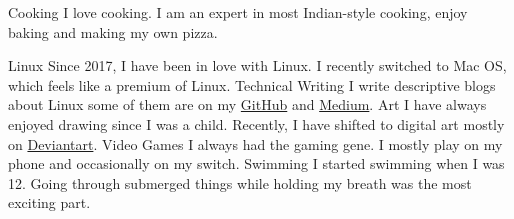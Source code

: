 



\begin{cvskills}
  \cvskill
    {Cooking} %
    {I love cooking. I am an expert in most Indian-style cooking, enjoy baking and making my own pizza.} %

  \cvskill
    {Linux} %
    {Since 2017, I have been in love with Linux. I recently switched to Mac OS, which feels like a premium of Linux.} %
  \cvskill
    {Technical Writing} %
    {I write descriptive blogs about Linux some of them are on my \href{https://github.com/themagicalmammal/howtodebuntu}{GitHub} and \href{https://medium.com/@d19cyber}{Medium}.} %
  \cvskill
    {Art} %
    {I have always enjoyed drawing since I was a child. Recently, I have shifted to digital art mostly on \href{https://www.deviantart.com/themagicalmammal}{Deviantart}.} %
  \cvskill
    {Video Games} %
    {I always had the gaming gene. I mostly play on my phone and occasionally on my switch.} %
  \cvskill
    {Swimming} %
    {I started swimming when I was 12. Going through submerged things while holding my breath was the most exciting part.} %

\end{cvskills}